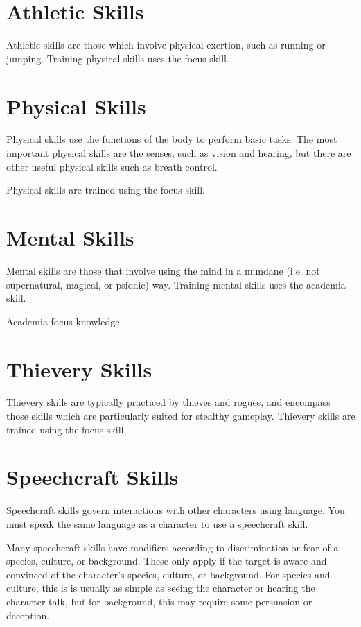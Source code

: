 \begin{multicols*}{2}

    \section{Athletic Skills}
    Athletic skills are those which involve physical exertion, such as running
    or jumping. Training physical skills uses the focus skill.

    \section{Physical Skills}
    Physical skills use the functions of the body to perform basic tasks. The
    most important physical skills are the senses, such as vision and hearing,
    but there are other useful physical skills such as breath control.

    Physical skills are trained using the focus skill.

    \section{Mental Skills}
    Mental skills are those that involve using the mind in a mundane (i.e. not
    supernatural, magical, or psionic) way. Training mental skills uses the
    academia skill.

    {Academia}
    {focus}
    {knowledge}

    \section{Thievery Skills}
    Thievery skills are typically practiced by thieves and rogues, and
    encompass those skills which are particularly suited for stealthy
    gameplay. Thievery skills are trained using the focus skill.

    \section{Speechcraft Skills}\label{speechcraft-skills}
    Speechcraft skills govern interactions with other characters using language.
    You must speak the same language as a character to use a speechcraft skill.

    Many speechcraft skills have modifiers according to discrimination or fear of
    a species, culture, or background. These only apply if the target is aware and
    convinced of the character's species, culture, or background. For species and
    culture, this is is usually as simple as seeing the character or hearing the
    character talk, but for background, this may require some persuasion or
    deception.
    

\end{multicols*}
